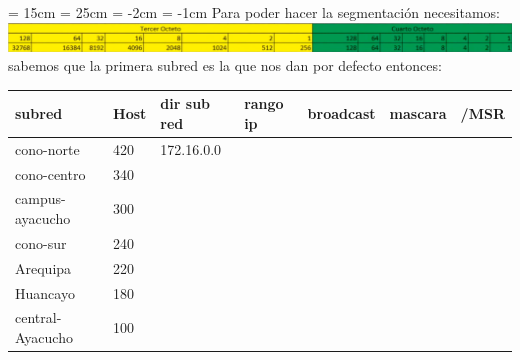 \newpage
\begin{landscape}
\textheight = 15cm
\textwidth = 25cm %
\topmargin = -2cm
\oddsidemargin = -1cm
Para poder hacer la segmentaci\'on necesitamos: \\
\includegraphics[scale=0.5]{img/octetos.png}
\\
sabemos que la primera subred es la que nos dan por defecto entonces: \\



\begin{table}[htbp]
\begin{tabular}{|l|l|l|l|l|l|l|}
\hline
\rowcolor[HTML]{32CB00} 
\textbf{subred}  & Host & \textbf{dir sub red} & \textbf{rango ip} & \textbf{broadcast} & \textbf{mascara} & \textbf{/MSR} \\ \hline
cono-norte       & 420  & 172.16.0.0           &                   &                    &                  &               \\ \hline
cono-centro      & 340  &                      &                   &                    &                  &               \\ \hline
campus-ayacucho  & 300  &                      &                   &                    &                  &               \\ \hline
cono-sur         & 240  &                      &                   &                    &                  &               \\ \hline
Arequipa         & 220  &                      &                   &                    &                  &               \\ \hline
Huancayo         & 180  &                      &                   &                    &                  &               \\ \hline
central-Ayacucho & 100  &                      &                   &                    &                  &               \\ \hline
\end{tabular}
\end{table}



\end{landscape}
